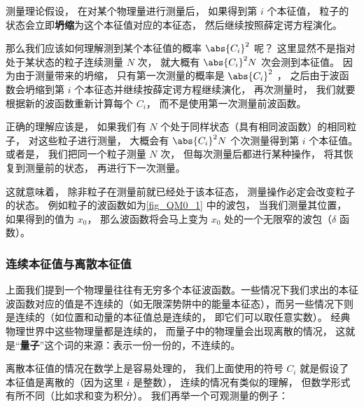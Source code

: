 测量理论假设， 在对某个物理量进行测量后， 如果得到第 $i$ 个本征值， 粒子的状态会立即\textbf{坍缩}为这个本征值对应的本征态， 然后继续按照薛定谔方程演化。

那么我们应该如何理解测到某个本征值的概率 $\abs{C_i}^2$ 呢？ 这里显然不是指对处于某状态的粒子连续测量 $N$ 次， 就大概有 $\abs{C_i}^2 N$ 次会测到本征值。 因为由于测量带来的坍缩， 只有第一次测量的概率是 $\abs{C_i}^2$ ， 之后由于波函数会坍缩到第 $i$ 个本征态并继续按薛定谔方程继续演化， 再次测量时， 我们就要根据新的波函数重新计算每个 $C_i$， 而不是使用第一次测量前波函数。

正确的理解应该是， 如果我们有 $N$ 个处于同样状态（具有相同波函数）的相同粒子， 对这些粒子进行测量， 大概会有 $\abs{C_i}^2 N$ 个次测量得到第 $i$ 个本征值。 或者是， 我们把同一个粒子测量 $N$ 次， 但每次测量后都进行某种操作， 将其恢复到测量前的状态， 再进行下一次测量。

这就意味着， 除非粒子在测量前就已经处于该本征态， 测量操作必定会改变粒子的状态。 例如粒子的波函数如为\autoref{fig_QM0_1} 中的波包， 当我们测量其位置， 如果得到的值为 $x_0$， 那么波函数将会马上变为 $x_0$ 处的一个无限窄的波包（$\delta$ 函数）。

\subsubsection{连续本征值与离散本征值}
上面我们提到一个物理量往往有无穷多个本征波函数。一些情况下我们求出的本征波函数对应的值是不连续的（如无限深势阱中的能量本征态），而另一些情况下则是连续的（如位置和动量的本征值总是连续的， 即它们可以取任意实数）。 经典物理世界中这些物理量都是连续的， 而量子中的物理量会出现离散的情况， 这就是“\textbf{量子}”这个词的来源：表示一份一份的，不连续的。

离散本征值的情况在数学上是容易处理的， 我们上面使用的符号 $C_i$ 就是假设了本征值是离散的（因为这里 $i$ 是整数）， 连续的情况有类似的理解， 但数学形式有所不同（比如求和变为积分）。 我们再举一个可观测量的例子：

